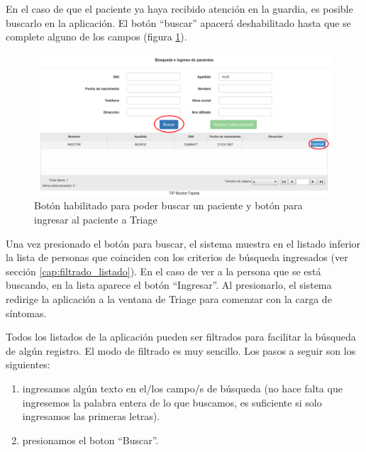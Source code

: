 En el caso de que el paciente ya haya recibido atención en la guardia, es posible buscarlo en la aplicación. El botón ``buscar'' apacerá deshabilitado hasta que se complete alguno de los campos (figura \ref{fig:inicio_busqueda}).
\begin{figure}
\centerline{\includegraphics[width=0.99\textwidth]{inicio_busqueda.png}}
\caption{Botón habilitado para poder buscar un paciente y botón para ingresar al paciente a Triage} \label{fig:inicio_busqueda}
\end{figure}
Una vez presionado el botón para buscar, el sistema muestra en el listado inferior la lista de personas que coinciden con los criterios de búsqueda ingresados (ver sección \ref{cap:filtrado_listado}). En el caso de ver a la persona que se está buscando, en la lista aparece el botón ``Ingresar''. Al presionarlo, el sistema redirige la aplicación a la ventana de Triage para comenzar con la carga de síntomas.

\label{cap:filtrado_listado}
Todos los listados de la aplicación pueden ser filtrados para facilitar la búsqueda de algún registro. El modo de filtrado es muy sencillo. Los pasos a seguir son los siguientes:
\begin{enumerate}
\item ingresamos algún texto en el/los campo/s de búsqueda (no hace falta que ingresemos la palabra entera de lo que buscamos, es suficiente si solo ingresamos las primeras letras).
\item presionamos el boton ``Buscar''.
\end{enumerate}

